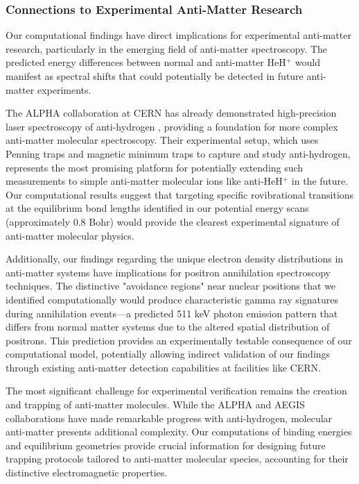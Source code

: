 \documentclass[10pt,twocolumn,a4paper]{article}
\begin{document}
\subsubsection{Connections to Experimental Anti-Matter Research}
Our computational findings have direct implications for experimental anti-matter research, particularly in the emerging field of anti-matter spectroscopy. The predicted energy differences between normal and anti-matter HeH$^+$ would manifest as spectral shifts that could potentially be detected in future anti-matter experiments.

The ALPHA collaboration at CERN has already demonstrated high-precision laser spectroscopy of anti-hydrogen \cite{alpha2022spectroscopy}, providing a foundation for more complex anti-matter molecular spectroscopy. Their experimental setup, which uses Penning traps and magnetic minimum traps to capture and study anti-hydrogen, represents the most promising platform for potentially extending such measurements to simple anti-matter molecular ions like anti-HeH$^+$ in the future. Our computational results suggest that targeting specific rovibrational transitions at the equilibrium bond lengths identified in our potential energy scans (approximately 0.8 Bohr) would provide the clearest experimental signature of anti-matter molecular physics.

Additionally, our findings regarding the unique electron density distributions in anti-matter systems have implications for positron annihilation spectroscopy techniques. The distinctive "avoidance regions" near nuclear positions that we identified computationally would produce characteristic gamma ray signatures during annihilation events—a predicted 511 keV photon emission pattern that differs from normal matter systems due to the altered spatial distribution of positrons. This prediction provides an experimentally testable consequence of our computational model, potentially allowing indirect validation of our findings through existing anti-matter detection capabilities at facilities like CERN.

The most significant challenge for experimental verification remains the creation and trapping of anti-matter molecules. While the ALPHA and AEGIS collaborations have made remarkable progress with anti-hydrogen, molecular anti-matter presents additional complexity. Our computations of binding energies and equilibrium geometries provide crucial information for designing future trapping protocols tailored to anti-matter molecular species, accounting for their distinctive electromagnetic properties.
\end{document}
